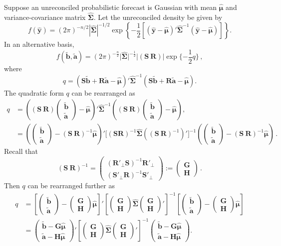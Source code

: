 \documentclass[12pt]{article}
\def\PQ{\begin{pmatrix}\bm{G}\\[-0.2cm]\bm{H}\end{pmatrix}}
\def\bt{\begin{pmatrix}\tilde{\bm{b}}\\[-0.2cm]\tilde{\bm{a}}\end{pmatrix}}
\theoremstyle{definition}
\begin{document}
Suppose an unreconciled probabilistic forecast is Gaussian with mean $\hat{\bm{\mu}}$ and variance-covariance matrix $\hat{\bm{\Sigma}}$. Let the unreconciled density be given by
\begin{equation}
f(\hat{\bm{y}})=(2\pi)^{-n/2}|\hat{\bm{\Sigma}}|^{-1/2}\exp\left\{-\frac{1}{2}\left[(\hat{\bm{y}}-\hat{\bm{\mu}})'\hat{\bm{\Sigma}}^{-1}(\hat{\bm{y}}-\hat{\bm{\mu}})\right]\right\}.
\end{equation}
In an alternative basis,
\begin{equation}
f(\tilde{\bm{b}},\tilde{\bm{a}})=(2\pi)^{-\frac{n}{2}}\Big|\hat{\bm{\Sigma}}\Big|^{-\frac{1}{2}}\Big|(\bm{S} ~  \bm{R})\Big|\exp\{-\frac{1}{2}q\}\,,
\end{equation}
where
\begin{equation}
q=(\bm{S}\tilde{\bm{b}}+\bm{R}\tilde{\bm{a}}-\hat{\bm{\mu}})' \hat{\bm{\Sigma}}^{-1}(\bm{S}\tilde{\bm{b}}+\bm{R}\tilde{\bm{a}}-\hat{\bm{\mu}}).
\end{equation}
The quadratic form $q$ can be rearranged as
\begin{align*}
q& =
\left((\bm{S} ~  \bm{R})\bt-\hat{\bm{\mu}}\right)' \hat{\bm{\Sigma}}^{-1}\left((\bm{S} ~ \bm{R})\bt-\hat{\bm{\mu}}\right),\\
& =
\left(\bt-(\bm{S} ~ \bm{R})^{-1}\hat{\bm{\mu}}\right)' \Big[(\bm{S}  \bm{R})^{-1}\hat{\bm{\Sigma}}\left((\bm{S} ~ \bm{R})^{-1}\right)'\Big]^{-1}
\left(\bt-(\bm{S} ~ \bm{R})^{-1}\hat{\bm{\mu}}\right)\,.
\end{align*}
Recall that
\[
(\bm{S} ~ \bm{R})^{-1} =
\begin{pmatrix}(\bm{R}'_\bot \bm{S})^{-1}\bm{R}'_\bot  \\ (\bm{S}'_\bot \bm{R})^{-1}\bm{S}'_\bot \end{pmatrix} :=
\begin{pmatrix}
\bm{G} \\\bm{H}
\end{pmatrix}\,.
\]
Then $q$ can be rearranged further as
\begin{align*}
q& =%
\left[\bt-\PQ\hat{\bm{\mu}}\right]'%
\left[\PQ\hat{\bm{\Sigma}}\PQ'\right]^{-1}\left[\bt-\PQ\hat{\bm{\mu}}\right] %
\\[0.5cm]
& =%
\begin{pmatrix}\tilde{\bm{b}} - \bm{G}\hat{\bm{\mu}}\\ \tilde{\bm{a}}- \bm{H}\hat{\bm{\mu}}\end{pmatrix}' %
\left[\PQ\hat{\bm{\Sigma}}\PQ'\right]^{-1}\begin{pmatrix}\tilde{\bm{b}} - \bm{G}\hat{\bm{\mu}}\\ \tilde{\bm{a}}- \bm{H}\hat{\bm{\mu}}\end{pmatrix}. %
\end{align*}
\end{document}
